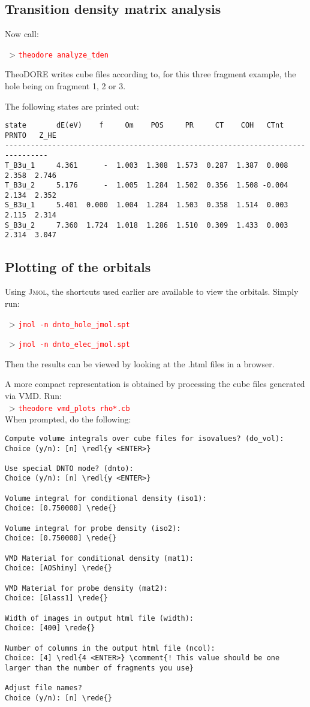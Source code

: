 \documentclass[DIV=12,headings=normal]{scrartcl}
\newcommand{\comment}[1]{\textcolor{blue}{#1}}
\newcommand{\redl}[1]{{\textcolor{red}{\texttt{#1}}}}
\newcommand{\rede}[1]{\redl{#1 <ENTER>}}
\newcommand{\comm}[1]{
\small
~> \redl{#1}
\normalsize
}
\newcounter{number}
\begin{document}
\subsection{Transition density matrix analysis}
Now call:
\comm{theodore analyze\_tden}

TheoDORE writes cube files according to, for this three fragment example, the hole being on fragment 1, 2 or 3.

The following states are printed out:

\scriptsize
\begin{Verbatim}[commandchars=\\\{\}]
state       dE(eV)    f     Om    POS     PR     CT    COH   CTnt  PRNTO   Z_HE
--------------------------------------------------------------------------------
T_B3u_1     4.361      -  1.003  1.308  1.573  0.287  1.387  0.008  2.358  2.746
T_B3u_2     5.176      -  1.005  1.284  1.502  0.356  1.508 -0.004  2.134  2.352
S_B3u_1     5.401  0.000  1.004  1.284  1.503  0.358  1.514  0.003  2.115  2.314
S_B3u_2     7.360  1.724  1.018  1.286  1.510  0.309  1.433  0.003  2.314  3.047
\end{Verbatim}
\normalsize

\subsection{Plotting of the orbitals}
Using \textsc{Jmol}, the shortcuts used earlier are available to view the orbitals. Simply run:

\comm{jmol -n dnto\_hole\_jmol.spt}
\comm{jmol -n dnto\_elec\_jmol.spt}

Then the results can be viewed by looking at the .html files in a browser.

A more compact representation is obtained by processing the cube files generated via VMD. Run:\\
\comm{theodore vmd\_plots rho*.cb}\\
When prompted, do the following:
\scriptsize
\begin{Verbatim}[commandchars=\\\{\}]
Compute volume integrals over cube files for isovalues? (do_vol):
Choice (y/n): [n] \redl{y <ENTER>}

Use special DNTO mode? (dnto):
Choice (y/n): [n] \redl{y <ENTER>}

Volume integral for conditional density (iso1):
Choice: [0.750000] \rede{}

Volume integral for probe density (iso2):
Choice: [0.750000] \rede{}

VMD Material for conditional density (mat1):
Choice: [AOShiny] \rede{}

VMD Material for probe density (mat2):
Choice: [Glass1] \rede{}

Width of images in output html file (width):
Choice: [400] \rede{}

Number of columns in the output html file (ncol):
Choice: [4] \redl{4 <ENTER>} \comment{! This value should be one larger than the number of fragments you use}

Adjust file names?
Choice (y/n): [n] \rede{}
\end{Verbatim}
\normalsize
\end{document}
